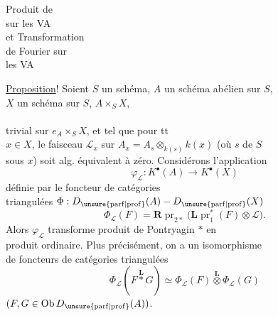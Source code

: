 \begin{flushright}
Produit de \\
sur les VA\\
et Transformation\\
de Fourier sur\\
les VA
\end{flushright}

\uline{Proposition}! Soient $S$ un schéma, $A$ un schéma abélien sur $S$,\\
$X$ un schéma sur $S$,   $A\times_S X$,\\
\\
trivial sur $e_A\times_S X$, et tel que  pour tt\\
$x\in X$, le faisceau $\mathcal L_x$ sur $A_x=A_s\otimes_{k(s)}k(x)$ (où $s$  de $S$\\
sous $x$) soit alg. équivalent à zéro. Considérons l'application
\[
\varphi_{\mathcal L}:K^\bullet(A)\longrightarrow K^\bullet(X)
\]
définie par  le foncteur de catégories\\
triangulées $\Phi:D_{\unsure{\mathrm{parf}|\mathrm{prof}}}(A)\mathbin{-}D_{\unsure{\mathrm{parf}|\mathrm{prof}}}(X)$
\[
\Phi_{\mathcal L}(F)=\mathbf R\operatorname{pr}_{2*}\bigl(\mathbf L\operatorname{pr}_1^*(F)\otimes\mathcal L\bigr).
\]
Alors $\varphi_{\mathcal L}$ transforme produit de Pontryagin $*$ en\\
produit ordinaire. Plus précisément, on a un isomorphisme\\
de foncteurs de catégories triangulées
\[
\Phi_{\mathcal L}(F\overset{\mathbf L}{*}G)\simeq
\Phi_{\mathcal L}(F)\overset{\mathbf L}{\otimes}\Phi_{\mathcal L}(G)
\]
$(F,G\in\operatorname{Ob}D_{\unsure{\mathrm{parf}|\mathrm{prof}}}(A))$.

